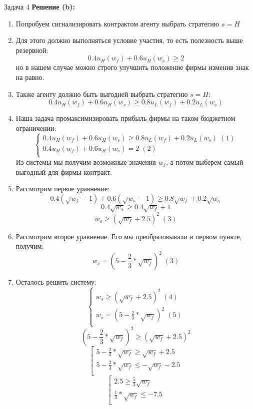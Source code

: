 \begin{mybox}{Задача 4}
    \textbf{Решение (b):}
    \begin{enumerate}
        \item Попробуем сигнализировать контрактом агенту выбрать стратегию $s=H$
        \item Для этого должно выполняться условие участия, то есть полезность выше резервной: $$0.4u_H(w_f)+0.6u_H(
        w_s)\geq2$$ но в нашем случае можно строго улучшить положение фирмы изменив знак на равно.
        \item Также агенту должно быть выгодней выбрать стратегию $s=H$: $$0.4u_H(w_f)+0.6u_H(w_s)\geq0.8u_L(w_f)+0
        .2u_L(w_s)$$
        \item Наша задача промаксимизировать прибыль фирмы на таком бюджетном ограничении: $$\begin{cases}
            0.4u_H(w_f)+0.6u_H(w_s)\geq0.8u_L(w_f)+0.2u_L(w_s) \;(1)\\
            0.4u_H(w_f)+0.6u_H(w_s)=2\; (2) \\
        \end{cases}$$
        Из системы мы получим возможные значения $w_f$, а потом выберем самый выгодный для фирмы контракт.
        \item Рассмотрим первое уравнение: $$0.4(\sqrt{w_f}-1)+0.6(\sqrt{w_s}-1)\geq0.8\sqrt{w_f}+0.2\sqrt{w_s}$$
        $$0.4\sqrt{w_s}\geq0.4\sqrt{w_f}+1$$
        $$w_s\geq(\sqrt{w_f}+2.5)^2\; (3)$$
        \item Рассмотрим второе уравнение. Его мы преобразовывали в первом пункте, получим: $$w_s=(5-\frac{2}{3}*\sqrt{w_f})^2\;(3)$$
        \item Осталось решить систему: $$\begin{cases}
            w_s\geq(\sqrt{w_f}+2.5)^2\; (4) \\
            w_s=(5-\frac{2}{3}*\sqrt{w_f})^2\;(5) \\
        \end{cases}$$
        $$(5-\frac{2}{3}*\sqrt{w_f})^2\geq(\sqrt{w_f}+2.5)^2$$
        $$\left[
          \begin{gathered}
              5-\frac{2}{3}*\sqrt{w_f}\geq\sqrt{w_f}+2.5 \\
              5-\frac{2}{3}*\sqrt{w_f}\leq-\sqrt{w_f}-2.5 \\
          \end{gathered}
        \right.$$
        $$\left[
          \begin{gathered}
              2.5\geq\frac{5}{3}\sqrt{w_f} \\
              \frac{1}{3}*\sqrt{w_f}\leq-7.5 \\

\end{gathered}$$
\end{enumerate}
\end{mybox}
